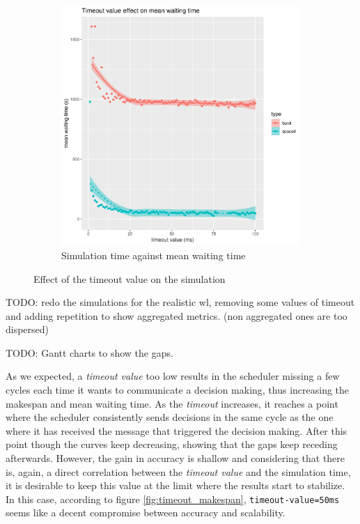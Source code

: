 \documentclass[12pt, a4paper]{memoir}
\begin{document}
\begin{figure}[h]
	\centering
	\begin{subfigure}{.5\textwidth}
		\centering
		\includegraphics[width=\linewidth]{imgs/timeout_mwt.png}
		\caption{Simulation time against mean waiting time}
		\label{fig:timeout_mwt}
	\end{subfigure}
	\caption{Effect of the timeout value on the simulation}
	\label{fig:timeout}
\end{figure}

TODO: redo the simulations for the realistic wl, removing some values of
timeout and adding repetition to show aggregated metrics. (non aggregated ones
are too dispersed)

TODO: Gantt charts to show the gaps.

As we expected, a \textit{timeout value} too low results in the scheduler
missing a few cycles each time it wants to communicate a decision making, thus
increasing the makespan and mean waiting time.  As the \textit{timeout}
increases, it reaches a point where the scheduler consistently sends decisions
in the same cycle as the one where it has received the message that triggered
the decision making. After this point though the curves keep decreasing,
showing that the gaps keep receding afterwards. However, the gain in accuracy
is shallow and considering that there is, again, a direct correlation between
the \textit{timeout value} and the simulation time, it is desirable to keep
this value at the limit where the results start to stabilize.  In this case,
according to figure \ref{fig:timeout_makespan}, \texttt{timeout-value=50ms}
seems like a decent compromise between accuracy and scalability.
\end{document}
